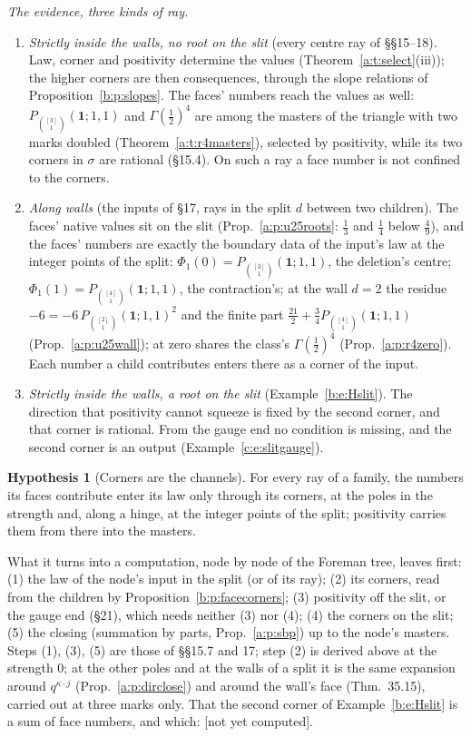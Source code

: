 \documentclass[11pt]{article}
\newcommand{\one}{\mathbf 1}
\newcommand{\Pth}{P_{\binom{[3]}1}(\one;1,1)}
\newcommand{\Pfour}{P_{\binom{[4]}1}(\one;1,1)}
\theoremstyle{plain}
\theoremstyle{definition}
\newtheorem{hypothesis}[proposition]{Hypothesis}
\theoremstyle{remark}
\newcommand{\notyet}{\textup{[not yet computed]}}
\begin{document}
\noindent\emph{The evidence, three kinds of ray.}
\begin{enumerate}[label=(\alph*)]
\item \emph{Strictly inside the walls, no root on the slit} (every centre ray of \S\S15--18). Law, corner and positivity determine the values (Theorem~\ref{a:t:select}(iii)); the higher corners are then consequences, through the slope relations of Proposition~\ref{b:p:slopes}. The faces' numbers reach the values as well: $\Pth$ and $\Gamma(\frac12)^4$ are among the masters of the triangle with two marks doubled (Theorem~\ref{a:t:r4masters}), selected by positivity, while its two corners in $\sigma$ are rational (\S15.4). On such a ray a face number is not confined to the corners.
\item \emph{Along walls} (the inputs of \S17, rays in the split $d$ between two children). The faces' native values sit on the slit (Prop.~\ref{a:p:u25roots}: $\frac13$ and $\frac14$ below $\frac49$), and the faces' numbers are exactly the boundary data of the input's law at the integer points of the split: $\Phi_1(0)=\Pth$, the deletion's centre; $\Phi_1(1)=\Pfour$, the contraction's; at the wall $d=2$ the residue $-6=-6\,P_{\binom{[2]}1}(\one;1,1)^2$ and the finite part $\frac{21}2+\frac34\Pfour$ (Prop.~\ref{a:p:u25wall}); at zero shares the class's $\Gamma(\frac12)^4$ (Prop.~\ref{a:p:r4zero}). Each number a child contributes enters there as a corner of the input.
\item \emph{Strictly inside the walls, a root on the slit} (Example~\ref{b:e:Hslit}). The direction that positivity cannot squeeze is fixed by the second corner, and that corner is rational. From the gauge end no condition is missing, and the second corner is an output (Example~\ref{c:e:slitgauge}).
\end{enumerate}

\begin{hypothesis}[Corners are the channels]\label{b:h:channels}
For every ray of a family, the numbers its faces contribute enter its law only through its corners, at the poles in the strength and, along a hinge, at the integer points of the split; positivity carries them from there into the masters.
\end{hypothesis}

\noindent What it turns into a computation, node by node of the Foreman tree, leaves first: (1) the law of the node's input in the split (or of its ray); (2) its corners, read from the children by Proposition~\ref{b:p:facecorners}; (3) positivity off the slit, or the gauge end (\S21), which needs neither (3) nor (4); (4) the corners on the slit; (5) the closing (summation by parts, Prop.~\ref{a:p:sbp}) up to the node's masters. Steps (1), (3), (5) are those of \S\S15.7 and 17; step (2) is derived above at the strength $0$; at the other poles and at the walls of a split it is the same expansion around $q^{\kappa\cdot j}$ (Prop.~\ref{a:p:dirclose}) and around the wall's face (Thm.~35.15), carried out at three marks only. That the second corner of Example~\ref{b:e:Hslit} is a sum of face numbers, and which: \notyet.
\end{document}

